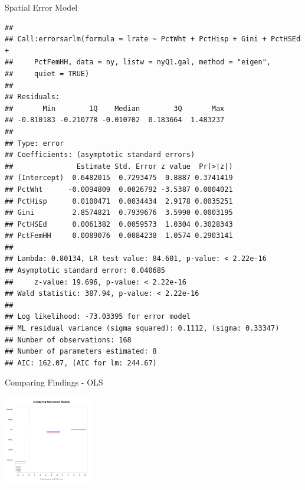 \documentclass[aspectratio = 169, 12pt]{beamer}\usepackage[]{graphicx}\usepackage[]{color}
\makeatletter
\newenvironment{kframe}{%
 \def\at@end@of@kframe{}%
 \ifinner\ifhmode%
  \def\at@end@of@kframe{\end{minipage}}%
  \begin{minipage}{\columnwidth}%
 \fi\fi%
 \def\FrameCommand##1{\hskip\@totalleftmargin \hskip-\fboxsep
 \colorbox{shadecolor}{##1}\hskip-\fboxsep
     \hskip-\linewidth \hskip-\@totalleftmargin \hskip\columnwidth}%
 \MakeFramed {\advance\hsize-\width
   \@totalleftmargin\z@ \linewidth\hsize
   \@setminipage}}%
 {\par\unskip\endMakeFramed%
 \at@end@of@kframe}
\newenvironment{knitrout}{}{} %
\makeatother
\begin{document}
\begin{frame}[fragile]{Spatial Error Model}
\begin{knitrout}\tiny
{}\color{fgcolor}\begin{kframe}


{\ttfamily\noindent\bfseries\color{errorcolor}{\#\# Error in ogrInfo(dsn = dsn, layer = layer, encoding = encoding, use\_iconv = use\_iconv, : Cannot open data source}}\begin{verbatim}
## 
## Call:errorsarlm(formula = lrate ~ PctWht + PctHisp + Gini + PctHSEd + 
##     PctFemHH, data = ny, listw = nyQ1.gal, method = "eigen", 
##     quiet = TRUE)
## 
## Residuals:
##       Min        1Q    Median        3Q       Max 
## -0.810183 -0.210778 -0.010702  0.183664  1.483237 
## 
## Type: error 
## Coefficients: (asymptotic standard errors) 
##               Estimate Std. Error z value  Pr(>|z|)
## (Intercept)  0.6482015  0.7293475  0.8887 0.3741419
## PctWht      -0.0094809  0.0026792 -3.5387 0.0004021
## PctHisp      0.0100471  0.0034434  2.9178 0.0035251
## Gini         2.8574821  0.7939676  3.5990 0.0003195
## PctHSEd      0.0061382  0.0059573  1.0304 0.3028343
## PctFemHH     0.0089076  0.0084238  1.0574 0.2903141
## 
## Lambda: 0.80134, LR test value: 84.601, p-value: < 2.22e-16
## Asymptotic standard error: 0.040685
##     z-value: 19.696, p-value: < 2.22e-16
## Wald statistic: 387.94, p-value: < 2.22e-16
## 
## Log likelihood: -73.03395 for error model
## ML residual variance (sigma squared): 0.1112, (sigma: 0.33347)
## Number of observations: 168 
## Number of parameters estimated: 8 
## AIC: 162.07, (AIC for lm: 244.67)
\end{verbatim}
\end{kframe}
\end{knitrout}
\end{frame}

\begin{frame}[fragile]{Comparing Findings - OLS}
\begin{knitrout}\tiny
{}\color{fgcolor}\begin{kframe}


{\ttfamily\noindent\bfseries\color{errorcolor}{\#\# Error in ogrInfo(dsn = dsn, layer = layer, encoding = encoding, use\_iconv = use\_iconv, : Cannot open data source}}

{\ttfamily\noindent\color{warningcolor}{\#\# Warning in data.row.names(row.names, rowsi, i): some row.names duplicated: 7,8,9,10,11,12,13,14,15,16,17,18 --> row.names NOT used}}\end{kframe}
\includegraphics[width=150px]{figure/unnamed-chunk-15-1} 

\end{knitrout}
\end{frame}
\end{document}
